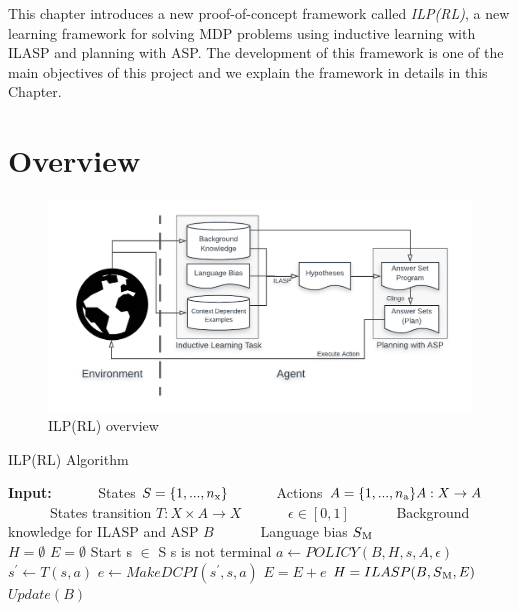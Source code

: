This chapter introduces a new proof-of-concept framework called \textit{ILP(RL)}, a new learning framework for solving MDP problems using inductive learning with ILASP and planning with ASP.
The development of this framework is one of the main objectives of this project and we explain the framework in details in this Chapter.

\section{Overview}
\label{sec:overview}

\begin{figure}[!htb]
\centering
\includegraphics[width=1.0\textwidth]{./figures/architecture}
\caption{ILP(RL) overview}
\label{fig:ILPRL_overview}
\end{figure}

\begin{algorithm}
\caption{ILP(RL) Algorithm}
\begin{algorithmic}[1]
\label{algo:ILPRL}
\renewcommand{\algorithmicrequire}{\textbf{Input:}}
\State \textbf{Input:}
\State \ \ \ \ \ \ States $S = \{ 1, ..., n\textsubscript{x}\}$
\State \ \ \ \ \ \ Actions $A = \{ 1, ..., n\textsubscript{a}\} A: X \rightarrow A$
\State \ \ \ \ \ \ States transition $T: X \times A \rightarrow X$
\State \ \ \ \ \ \ $\epsilon \in [0,1]$
\State \ \ \ \ \ \ Background knowledge for ILASP and ASP $B$
\State \ \ \ \ \ \ Language bias $S\textsubscript{M}$ \\

\State $H = \emptyset$
\State $E = \emptyset$
\State Start s $\in$ S
\While s is not terminal 
\State $a \leftarrow POLICY(B, H, s, A, \epsilon)$ \\
\space
{}
\State $s^\prime \leftarrow T(s,a)$
\space
{}
\State $e \leftarrow MakeDCPI(s^\prime, s, a) $ 
\State $E = E + e$
\space
{}
\State $H = ILASP(B, S\textsubscript{M}, E)$
\EndIf
\State $Update(B)$
\EndWhile
\EndProcedure
\end{algorithmic}
\end{algorithm}

